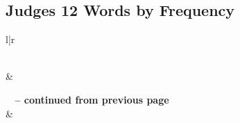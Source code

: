 

\subsection{Judges 12 Words by Frequency}


\normalsize
 
\begin{center}
\begin{longtable}{l|r}
\caption[Judges 12 Words by Frequency]{Judges 12 Words by Frequency}\label{table:WordsbyFrequency for Judges 12} \\
\hline {} &  \\ \hline 
\endfirsthead
 
{{\bfseries \tablename\ \thetable{} -- continued from previous page}} \\  
\hline {} &  \\ \hline 
\endhead
 

\end{longtable}
\end{center}
